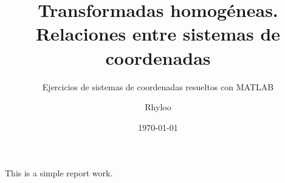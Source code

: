 \documentclass[11pt,a4paper]{article}
\begin{document}
\subject{Fundamentos de robótica}
\title{Transformadas homogéneas. Relaciones entre sistemas de coordenadas}
\subtitle{Ejercicios de sistemas de coordenadas resueltos con MATLAB}
\author{Rhyloo}
\date{\today}

\portada

This is a simple report work.
\end{document}
